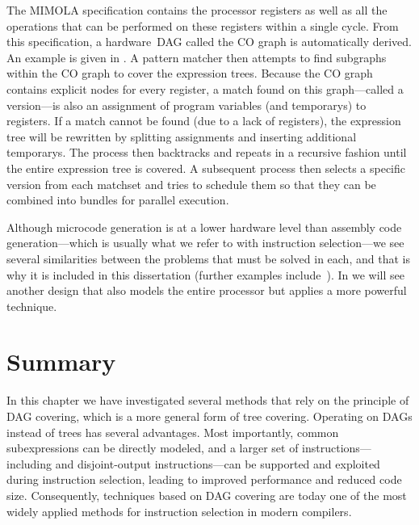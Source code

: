 %  

The \gls{MIMOLA} specification contains the processor \glspl{register} as well
as all the operations that can be performed on these \glspl{register} within a
single cycle.
%
From this specification, a hardware~\gls{DAG} called the \gls{CO
  graph} is automatically derived.
%
An example is given in
.
%
A \gls{pattern matcher} then attempts to find
\glspl{subgraph} within the \gls{CO graph} to cover the \glspl{expression tree}.
%
Because the \gls{CO graph} contains explicit \glspl{node} for every
\gls{register}, a \gls{match} found on this \gls{graph}---called a
\gls{version}---is also an assignment of \gls{program} variables (and
\glspl{temporary}) to \glspl{register}.
%
If a \gls{match} cannot be found (due to
a lack of \glspl{register}), the \gls{expression tree} will be rewritten by
splitting assignments and inserting additional \glspl{temporary}.
%
The process
then backtracks and repeats in a recursive fashion until the entire \gls{expression tree} is covered.
%
A subsequent process then selects a specific \gls{version}
from each \gls{matchset} and tries to schedule them so that they can be combined
into \glspl{bundle} for parallel execution.

Although \gls{microcode generation} is at a lower hardware level than
\gls{assembly code} generation---which is usually what we refer to with
\gls{instruction selection}---we see several similarities between the problems
that must be solved in each, and that is why it is included in this dissertation
(further examples include~\cite{Balakrishnan1986, Mahmood1990,
  Langevin1993}).
%
In  we will see another design that
also models the entire processor but applies a more powerful technique.


\section{Summary}

In this chapter we have investigated several methods that rely on the
\gls{principle} of \gls{DAG covering}, which is a more general form of \gls{tree
  covering}.
%
Operating on \glspl{DAG} instead of \glspl{tree} has several
advantages.
%
Most importantly, common subexpressions can be directly modeled, and
a larger set of \glspl{instruction}---including  and \glspl{disjoint-output instruction}---can be supported and
exploited during \gls{instruction selection}, leading to improved performance
and reduced code size.
%
Consequently, techniques based on \gls{DAG covering} are
today one of the most widely applied methods for \gls{instruction selection} in
modern \glspl{compiler}.

